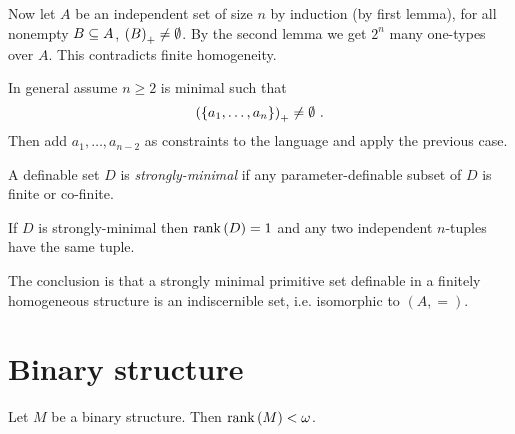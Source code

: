 \documentclass{amsart}
\begin{document}
\begin{Proof}
Now let $A$ be an independent set of size $n$ by induction (by first lemma), for all
nonempty $B\subseteq A$, $\left(B\right)_+\neq \emptyset$.
By the second lemma we get $2^n$ many one-types over $A$. 
This contradicts finite homogeneity.

In general assume $n \geq 2$ is minimal such that 
\begin{equation}
\left(\left\{a_1 , \ldots , a_n\right\}\right)_+\neq \emptyset \ .
\end{equation}
Then add $a_1 , \ldots , a_{n-2}$ as constraints to the language and apply
the previous case.
\end{Proof}

\begin{defn}
A definable set $D$ is \emph{strongly-minimal} if any parameter-definable subset of $D$ is
finite or co-finite. 
\end{defn}

If $D$ is strongly-minimal then $\operatorname{rank}\left(D\right) = 1$ and any 
two independent $n$-tuples have the same tuple.

The conclusion is that a strongly minimal primitive set definable in a finitely
homogeneous structure is an indiscernible set, i.e. isomorphic to $\left(A , =\right)$.

\section{Binary structure}

\begin{prop}
Let $M$ be a binary structure. Then $\operatorname{rank}\left(M\right)< \omega$.
\end{prop}
\end{document}
